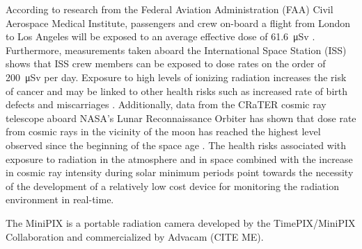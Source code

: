 According to research from the Federal Aviation Administration (FAA) Civil Aerospace Medical Institute, passengers and crew on-board a flight from London to Los Angeles will be exposed to an average effective dose of \SI{61.6}{\micro\sievert} \cite{faa}. Furthermore, measurements taken aboard the International Space Station (ISS) shows that ISS crew members can be exposed to dose rates on the order of \SI{200}{\micro\sievert} per day. Exposure to high levels of ionizing radiation increases the risk of cancer and may be linked to other health risks such as increased rate of birth defects and miscarriages \cite{flightatt}. 
Additionally, data from the CRaTER cosmic ray telescope aboard NASA’s Lunar Reconnaissance Orbiter has shown that dose rate from cosmic rays in the vicinity of the moon has reached the highest level observed since the beginning of the space age \cite{crater}. The health risks associated with exposure to radiation in the atmosphere and in space combined with the increase in cosmic ray intensity during solar minimum periods point towards the necessity of the development of a relatively low cost device for monitoring the radiation environment in real-time.

The MiniPIX is a portable radiation camera developed by the TimePIX/MiniPIX Collaboration and commercialized by Advacam (CITE ME).  


